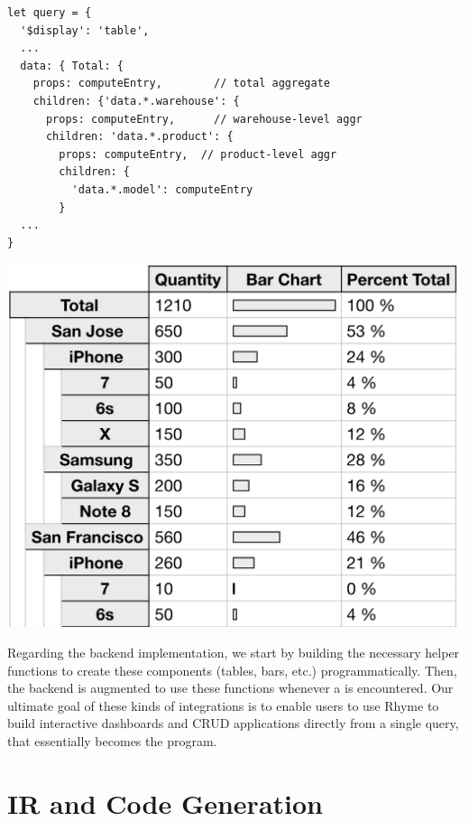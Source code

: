 \documentclass[runningheads]{llncs}
\newcommand{\lang}{Rhyme}
\begin{document}
\hspace{-18pt}
\begin{minipage}{0.6\textwidth}
\begin{lstlisting}[style=JavaScript,columns=flexible]
let query = {
  '$display': 'table',
  ...
  data: { Total: {                    
    props: computeEntry,        // total aggregate           
    children: {'data.*.warehouse': { 
      props: computeEntry,      // warehouse-level aggr
      children: 'data.*.product': {     
        props: computeEntry,  // product-level aggr
        children: {
          'data.*.model': computeEntry
        }
  ...
}
\end{lstlisting}
\end{minipage}%
\begin{minipage}{0.4\textwidth}
\centering
\includegraphics[width=\textwidth]{images/big_table.png}
\end{minipage}

Regarding the backend implementation, we start by building the necessary helper
functions to create these components (tables, bars, etc.) programmatically.
Then, the backend is augmented to use these functions whenever a 
is encountered.
Our ultimate goal of these kinds of integrations is to enable users
to use \lang{} to build interactive dashboards and CRUD applications 
directly from a single query, that essentially becomes the program.

\section{IR and Code Generation}~\label{sec:ir_codegen}
\end{document}
